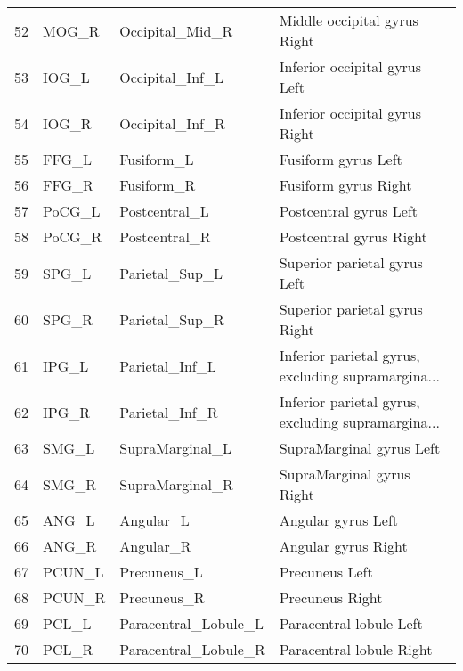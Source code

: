 \documentclass[12pt,reqno]{amsart}
\theoremstyle{definition}
\begin{document}
\begin{longtable}{rlll}
 52 &       MOG\_R &      Occipital\_Mid\_R &                       Middle occipital gyrus Right \\
 53 &       IOG\_L &      Occipital\_Inf\_L &                      Inferior occipital gyrus Left \\
 54 &       IOG\_R &      Occipital\_Inf\_R &                     Inferior occipital gyrus Right \\
 55 &       FFG\_L &           Fusiform\_L &                                Fusiform gyrus Left \\
 56 &       FFG\_R &           Fusiform\_R &                               Fusiform gyrus Right \\
 57 &      PoCG\_L &        Postcentral\_L &                             Postcentral gyrus Left \\
 58 &      PoCG\_R &        Postcentral\_R &                            Postcentral gyrus Right \\
 59 &       SPG\_L &       Parietal\_Sup\_L &                       Superior parietal gyrus Left \\
 60 &       SPG\_R &       Parietal\_Sup\_R &                      Superior parietal gyrus Right \\
 61 &       IPG\_L &       Parietal\_Inf\_L & Inferior parietal gyrus, excluding supramargina... \\
 62 &       IPG\_R &       Parietal\_Inf\_R & Inferior parietal gyrus, excluding supramargina... \\
 63 &       SMG\_L &      SupraMarginal\_L &                           SupraMarginal gyrus Left \\
 64 &       SMG\_R &      SupraMarginal\_R &                          SupraMarginal gyrus Right \\
 65 &       ANG\_L &            Angular\_L &                                 Angular gyrus Left \\
 66 &       ANG\_R &            Angular\_R &                                Angular gyrus Right \\
 67 &      PCUN\_L &          Precuneus\_L &                                     Precuneus Left \\
 68 &      PCUN\_R &          Precuneus\_R &                                    Precuneus Right \\
 69 &       PCL\_L & Paracentral\_Lobule\_L &                            Paracentral lobule Left \\
 70 &       PCL\_R & Paracentral\_Lobule\_R &                           Paracentral lobule Right \\

\end{longtable}
\end{document}
